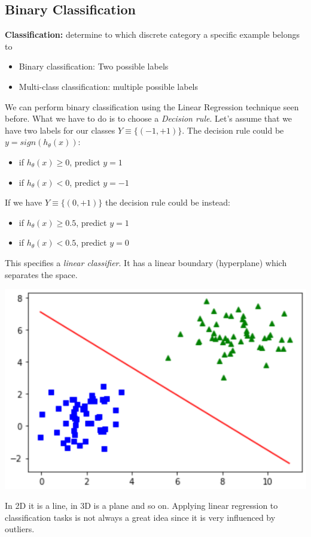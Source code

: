 \subsection{Binary Classification}
\textbf{Classification: } determine to which discrete category a specific example belongs to
\begin{itemize}
    \item Binary classification: Two possible labels
    \item Multi-class classification: multiple possible labels
\end{itemize}
We can perform binary classification using the Linear Regression technique seen before. What we have to do is to choose a \textit{Decision rule}.
Let's assume that we have two labels for our classes $Y \equiv \{(-1,+1)\}$. The decision rule could be $y = sign(h_{\theta}(x))$:
\begin{itemize}
    \item if $h_{\theta}(x) \geq 0$, predict $y=1$
    \item if $h_{\theta}(x) < 0$, predict $y=-1$
\end{itemize}
If we have $Y \equiv \{(0,+1)\}$ the decision rule could be instead:
\begin{itemize}
    \item if $h_{\theta}(x) \geq 0.5$, predict $y=1$
    \item if $h_{\theta}(x) < 0.5$, predict $y=0$
\end{itemize}
This specifies a \textit{linear classifier}. It has a linear boundary (hyperplane) which separates the space.
\begin{center}
    \includegraphics[scale = 0.7]{images/Hyperplanes in R^2.png}
\end{center}
In 2D it is a line, in 3D is a plane and so on.\newline
Applying linear regression to classification tasks is not always a great idea since it is very influenced by outliers.
